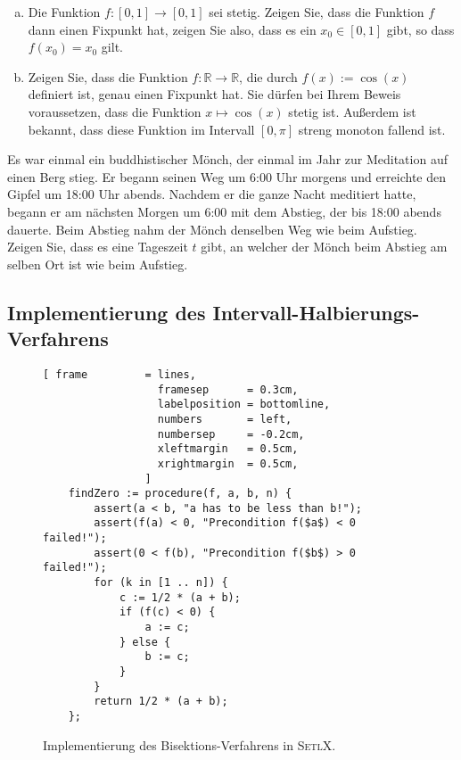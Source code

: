\exercise
\begin{enumerate}[(a)]
\item Die Funktion $f:[0,1] \rightarrow [0,1]$ sei stetig.  Zeigen Sie, dass die Funktion $f$ dann
      einen Fixpunkt hat, zeigen Sie also, dass es ein $x_0 \in [0,1]$ gibt, so dass
      \\[0.2cm]
      \hspace*{1.3cm}
      $f(x_0) = x_0$ \quad gilt.
      \pagebreak

\item Zeigen Sie, dass die Funktion $f: \mathbb{R} \rightarrow \mathbb{R}$, die durch $f(x) := \cos(x)$
      definiert ist, genau einen Fixpunkt hat.  Sie d\"urfen bei Ihrem Beweis voraussetzen, dass die
      Funktion $x \mapsto \cos(x)$ stetig ist.  Au{\ss}erdem ist bekannt, dass diese Funktion im Intervall 
      $[0, \pi]$ streng monoton fallend ist.
      \eox
\end{enumerate}

\exercise
Es war einmal ein buddhistischer M\"onch, der einmal im Jahr zur Meditation auf einen Berg stieg.
Er begann seinen Weg um 6:00 Uhr morgens und erreichte den Gipfel um 18:00 Uhr abends.  Nachdem er
die ganze Nacht meditiert hatte, begann er am n\"achsten Morgen um 6:00 mit dem Abstieg, der bis 18:00
abends dauerte.  Beim Abstieg nahm der M\"onch denselben Weg wie beim Aufstieg.  Zeigen Sie, dass es
eine Tageszeit $t$ gibt, an welcher der M\"onch beim Abstieg am selben Ort ist wie beim Aufstieg. 
\eox
 
\subsection{Implementierung des Intervall-Halbierungs-Verfahrens}

\begin{figure}[!ht]
  \centering
\begin{Verbatim}[ frame         = lines, 
                  framesep      = 0.3cm, 
                  labelposition = bottomline,
                  numbers       = left,
                  numbersep     = -0.2cm,
                  xleftmargin   = 0.5cm,
                  xrightmargin  = 0.5cm,
                ]
    findZero := procedure(f, a, b, n) {
        assert(a < b, "a has to be less than b!");   
        assert(f(a) < 0, "Precondition f($a$) < 0 failed!");
        assert(0 < f(b), "Precondition f($b$) > 0 failed!");
        for (k in [1 .. n]) {
            c := 1/2 * (a + b); 
            if (f(c) < 0) {
                a := c; 
            } else {
                b := c; 
            }
        }
        return 1/2 * (a + b);
    };
\end{Verbatim}
\vspace*{-0.3cm}
  \caption{Implementierung des Bisektions-Verfahrens in \textsc{SetlX}.}
  \label{fig:bisection.setlx}
\end{figure} %

